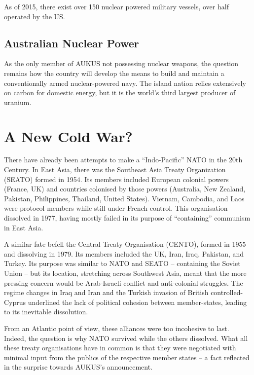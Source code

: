 \documentclass[letterpaper,12pt,twoside]{article} %
\begin{document}
\begin{multicols}{2}
As of 2015, there exist over 150 nuclear powered military vessels, over half operated by the US.\autocite[3]{hippel2016banning}

\subsection{Australian Nuclear Power}

As the only member of AUKUS not possessing nuclear weapons, the question remains how the country will develop the means to build and maintain a conventionally armed nuclear-powered navy. The island nation relies extensively on carbon for domestic energy, but it is the world's third largest producer of uranium.


\section{A New Cold War?}

There have already been attempts to make a ``Indo-Pacific'' NATO in the 20th Century. In East Asia, there was the Southeast Asia Treaty Organization (SEATO) formed in 1954. Its members included European colonial powers (France, UK) and countries colonised by those powers (Australia, New Zealand, Pakistan, Philippines, Thailand, United States). Vietnam, Cambodia, and Laos were protocol members while still under French control. This organisation dissolved in 1977, having mostly failed in its purpose of ``containing'' communism in East Asia.

A similar fate befell the Central Treaty Organisation (CENTO), formed in 1955 and dissolving in 1979. Its members included the UK, Iran, Iraq, Pakistan, and Turkey. Its purpose was similar to NATO and SEATO -- containing the Soviet Union -- but its location, stretching across Southwest Asia, meant that the more pressing concern would be Arab-Israeli conflict and anti-colonial struggles. The regime changes in Iraq and Iran and the Turkish invasion of British controlled-Cyprus underlined the lack of political cohesion between member-states, leading to its inevitable dissolution.

From an Atlantic point of view, these alliances were too incohesive to last. Indeed, the question is why NATO survived while the others dissolved. What all these treaty organisations have in common is that they were negotiated with minimal input from the publics of the respective member states -- a fact reflected in the surprise towards AUKUS's announcement.


\end{multicols}
\end{document}
